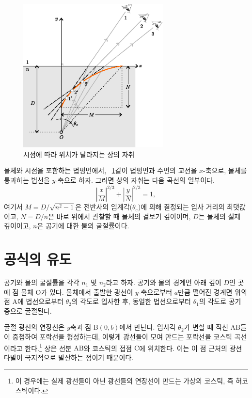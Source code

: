 \documentclass[twocolumn]{article}
\begin{document}
\begin{figure}
	\centering
	\includegraphics[width=3in]{figs/g409.eps}
	\caption{시점에 따라 위치가 달라지는 상의 자취}
	\label{fig:caustic}
\end{figure}

물체와 시점을 포함하는 법평면에서, \figurename\ \ref{fig:caustic}\과 같이 법평면과 수면의 교선을 $x$-축으로, 
물체를 통과하는 법선을 $y$-축으로 하자. 그러면 상의 자취는 다음 곡선의 일부이다.
	$$ \left| \dfrac{x}{M} \right| ^ {2/3} 
	+ \left| \dfrac{y}{N} \right| ^ {2/3} = 1,$$
여기서 $M = D/\sqrt{n^2 - 1}$은 전반사의 임계각($\theta_{\mathrm{c}}$)에 의해 결정되는 입사 거리의 최댓값이고, 
$N = D/n$은 바로 위에서 관찰할 때 물체의 겉보기 깊이이며, 
$D$는 물체의 실제 깊이이고, $n$은 공기에 대한 물의 굴절률이다.
	
\section{공식의 유도}
	
공기와 물의 굴절률을 각각 $n_1$ 및 $n_2$라고 하자. 공기와 물의 경계면 아래 깊이 $D$인 곳에 점 물체 $\mathrm{O}$가 있다. 
물체에서 출발한 광선이 $y$-축으로부터 $a$만큼 떨어진 경계면 위의 점 A에 
법선으로부터 $\theta_2$의 각도로 입사한 후, 동일한 법선으로부터 $\theta_1$의 각도로 공기 중으로 굴절된다. 

굴절 광선의 연장선은 $y$축과 점 B$(0, b)$에서 만난다. 입사각 $\theta_2$가 변할 때 직선 ${\mathrm{AB}}$들이 중첩하여 포락선을 형성하는데, 이렇게 광선들이 모여 만드는 포락선을 코스틱 곡선이라고 한다.\footnote{이 경우에는 실제 광선들이 아닌 광선들의 연장선이 만드는 가상의 코스틱, 즉 허코스틱이다.} 상은 선분 ${\mathrm{AB}}$와 코스틱의 접점 $\mathrm{C}$에 위치한다.  이는 이 점 근처의 광선 다발이 국지적으로 발산하는 점이기 때문이다. 
\end{document}
